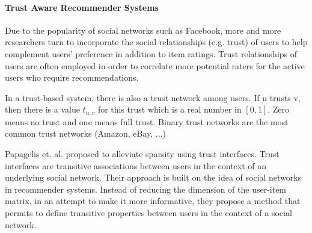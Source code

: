 			
	
\paragraph{Trust Aware Recommender Systems}


Due to the popularity of social networks such as Facebook, more and more researchers turn to incorporate the social relationships (e.g. trust) of users to help complement users’ preference in addition to item ratings. Trust relationships of users are often employed in order to correlate more potential raters for the active users who require recommendations.

In a trust-based system, there is also a trust network among users. If u trusts v, then there is a value $t_{u,v}$ for this trust which is a real number in $[0,1]$. Zero means no trust and one means full trust. Binary trust networks are the most common trust networks (Amazon, eBay, ...)




Papagelis et. al. \cite{Papagelis2005} proposed to alleviate sparsity using trust interfaces. Trust interfaces are transitive associations between users in the context of an underlying social network. Their approach is built on the idea of social networks in recommender systems. Instead of reducing the dimension of the user-item matrix, in an attempt to make it more informative, they propose a method that permits to define transitive properties between users in the context of a social network.

